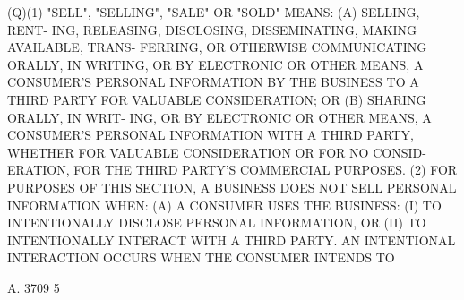    (Q)(1) "SELL", "SELLING", "SALE" OR "SOLD" MEANS: (A)  SELLING,  RENT-
 ING,  RELEASING,  DISCLOSING,  DISSEMINATING,  MAKING  AVAILABLE, TRANS-
 FERRING, OR OTHERWISE COMMUNICATING ORALLY, IN WRITING, OR BY ELECTRONIC
 OR OTHER MEANS, A CONSUMER'S PERSONAL INFORMATION BY THE BUSINESS  TO  A
 THIRD  PARTY FOR VALUABLE CONSIDERATION; OR (B) SHARING ORALLY, IN WRIT-
 ING, OR BY ELECTRONIC OR OTHER MEANS, A CONSUMER'S PERSONAL  INFORMATION
 WITH A THIRD PARTY, WHETHER FOR VALUABLE CONSIDERATION OR FOR NO CONSID-
 ERATION, FOR THE THIRD PARTY'S COMMERCIAL PURPOSES.
   (2)  FOR  PURPOSES  OF THIS SECTION, A BUSINESS DOES NOT SELL PERSONAL
 INFORMATION WHEN:
   (A) A CONSUMER  USES  THE  BUSINESS:  (I)  TO  INTENTIONALLY  DISCLOSE
 PERSONAL  INFORMATION,  OR  (II)  TO INTENTIONALLY INTERACT WITH A THIRD
 PARTY. AN INTENTIONAL INTERACTION OCCURS WHEN THE  CONSUMER  INTENDS  TO

 A. 3709                             5
 

